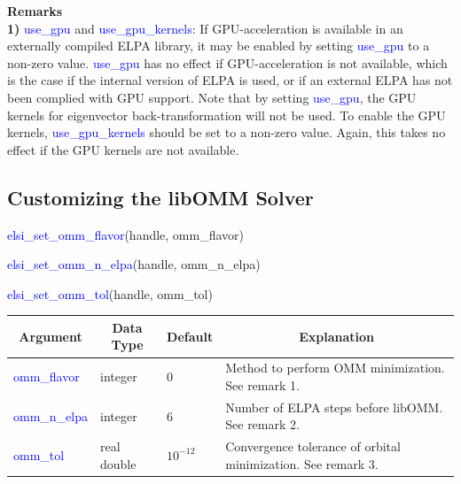 \documentclass{report}
\begin{document}
\bigskip
\textbf{Remarks}\\

\textbf{1)} \textcolor{blue}{use\_gpu} and \textcolor{blue}{use\_gpu\_kernels}:  If GPU-acceleration is available in an externally compiled ELPA library, it may be enabled by setting \textcolor{blue}{use\_gpu} to a non-zero value.  \textcolor{blue}{use\_gpu} has no effect if GPU-acceleration is not available, which is the case if the internal version of ELPA is used, or if an external ELPA has not been complied with GPU support.  Note that by setting \textcolor{blue}{use\_gpu}, the GPU kernels for eigenvector back-transformation will not be used.  To enable the GPU kernels, \textcolor{blue}{use\_gpu\_kernels} should be set to a non-zero value.  Again, this takes no effect if the GPU kernels are not available.\\

\subsection{Customizing the libOMM Solver}
\label{subsec:setter_omm}
\begin{labeling}{\hspace{6cm}}
\item [\hspace{0.3cm} \textcolor{blue}{elsi\_set\_omm\_flavor}(handle, omm\_flavor)]
\item [\hspace{0.3cm} \textcolor{blue}{elsi\_set\_omm\_n\_elpa}(handle, omm\_n\_elpa)]
\item [\hspace{0.3cm} \textcolor{blue}{elsi\_set\_omm\_tol}(handle, omm\_tol)]
\end{labeling}

\begin{tabular}[]{|p{30mm}|p{20mm}|p{15mm}|p{100mm}|}
\hline
\multicolumn{1}{|c|}{\textbf{Argument}} & \multicolumn{1}{c|}{\textbf{Data Type}} & \multicolumn{1}{c|}{\textbf{Default}} & \multicolumn{1}{c|}{\textbf{Explanation}}\\
\hline
\textcolor{blue}{omm\_flavor}  & integer     & 0          & Method to perform OMM minimization.  See remark 1.\\
\hline
\textcolor{blue}{omm\_n\_elpa} & integer     & 6          & Number of ELPA steps before libOMM.  See remark 2.\\
\hline
\textcolor{blue}{omm\_tol}     & real double & $10^{-12}$ & Convergence tolerance of orbital minimization.  See remark 3.\\
\hline
\end{tabular}
\end{document}
